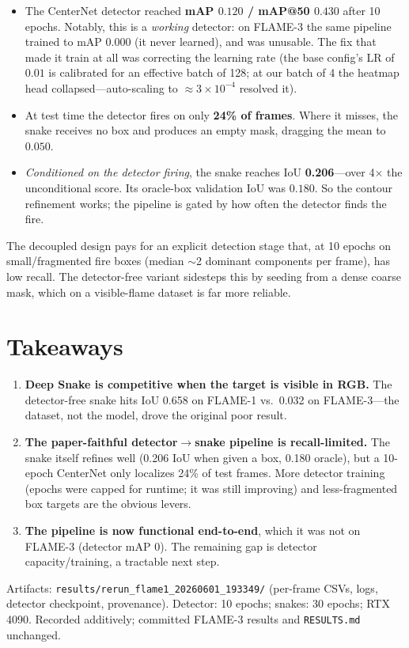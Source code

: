 \documentclass[10pt]{article}
\begin{document}
\begin{itemize}
\item The CenterNet detector reached \textbf{mAP $0.120$ / mAP@50 $0.430$} after 10
  epochs. Notably, this is a \emph{working} detector: on FLAME-3 the same pipeline
  trained to mAP $0.000$ (it never learned), and was unusable. The fix that made it
  train at all was correcting the learning rate (the base config's LR of $0.01$ is
  calibrated for an effective batch of 128; at our batch of 4 the heatmap head
  collapsed---auto-scaling to $\approx 3\times10^{-4}$ resolved it).
\item At test time the detector fires on only \textbf{24\% of frames}. Where it
  misses, the snake receives no box and produces an empty mask, dragging the mean
  to $0.050$.
\item \emph{Conditioned on the detector firing}, the snake reaches IoU
  \textbf{0.206}---over 4$\times$ the unconditional score. Its oracle-box validation
  IoU was $0.180$. So the contour refinement works; the pipeline is gated by how
  often the detector finds the fire.
\end{itemize}

The decoupled design pays for an explicit detection stage that, at 10 epochs on
small/fragmented fire boxes (median $\sim$2 dominant components per frame), has low
recall. The detector-free variant sidesteps this by seeding from a dense coarse
mask, which on a visible-flame dataset is far more reliable.

\section{Takeaways}

\begin{enumerate}
\item \textbf{Deep Snake is competitive when the target is visible in RGB.} The
  detector-free snake hits IoU 0.658 on FLAME-1 vs.\ 0.032 on FLAME-3---the dataset,
  not the model, drove the original poor result.
\item \textbf{The paper-faithful detector$\to$snake pipeline is recall-limited.} The
  snake itself refines well (0.206 IoU when given a box, 0.180 oracle), but a
  10-epoch CenterNet only localizes 24\% of test frames. More detector training
  (epochs were capped for runtime; it was still improving) and less-fragmented box
  targets are the obvious levers.
\item \textbf{The pipeline is now functional end-to-end}, which it was not on
  FLAME-3 (detector mAP 0). The remaining gap is detector capacity/training, a
  tractable next step.
\end{enumerate}

\vspace{0.5em}
\footnotesize
Artifacts: \texttt{results/rerun\_flame1\_20260601\_193349/} (per-frame CSVs, logs,
detector checkpoint, provenance). Detector: 10 epochs; snakes: 30 epochs; RTX 4090.
Recorded additively; committed FLAME-3 results and \texttt{RESULTS.md} unchanged.
\end{document}
